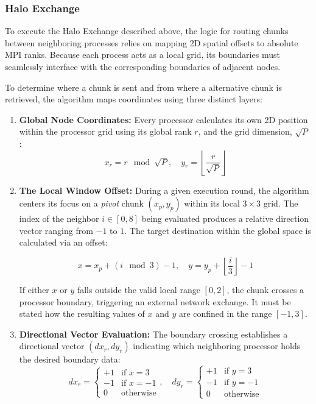 \subsubsection{Halo Exchange}
To execute the Halo Exchange described above, the logic for routing chunks between neighboring processes relies on mapping 2D spatial offsets to absolute MPI ranks. Because each process acts as a local grid, its boundaries must seamlessly interface with the corresponding boundaries of adjacent nodes.

To determine where a chunk is sent and from where a alternative chunk is retrieved, the algorithm maps coordinates using three distinct layers:

\begin{enumerate}
    \item \textbf{Global Node Coordinates:} Every processor calculates its own 2D position within the processor grid using its global rank $r$, and the grid dimension, $\sqrt P$:
    $$x_r = r \mod \sqrt P, \quad y_r = \left\lfloor \frac r{\sqrt P}\right\rfloor$$
    
    \item \textbf{The Local Window Offset:} During a given execution round, the algorithm centers its focus on a \textit{pivot} chunk $(x_p, y_p)$ within its local $3 \times 3$ grid. The index of the neighbor $i\in[0,8]$ being evaluated produces a relative direction vector ranging from $-1$ to $1$. The target destination within the global space is calculated via an offset:
    
    $$x = x_p + (i \mod3) - 1,\quad y = y_p + \left\lfloor \frac i3 \right\rfloor - 1$$
    
    If either $x$ or $y$ falls outside the valid local range $[0, 2]$, the chunk crosses a processor boundary, triggering an external network exchange. It must be stated how the resulting values of $x$ and $y$ are confined in the range $[-1,3]$.

    \item \textbf{Directional Vector Evaluation:} The boundary crossing establishes a directional vector $(dx_r, dy_r)$ indicating which neighboring processor holds the desired boundary data:
    $$
    dx_r = \begin{cases} 
        +1 & \text{if } x = 3  \\ 
        -1 & \text{if } x = -1 \\ 
        0  & \text{otherwise} %
    \end{cases}, \quad    
    dy_r = \begin{cases} 
        +1 & \text{if } y = 3  \\
        -1 & \text{if } y = -1 \\ 
        0  & \text{otherwise}
    \end{cases}$$
    
\end{enumerate}

